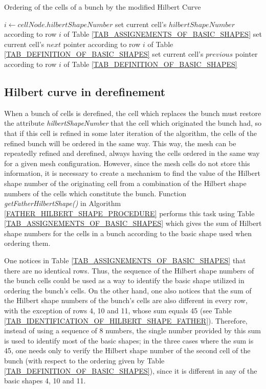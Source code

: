 \begin{algorithm}[!ht]
    \caption{Ordering of the cells of a bunch by the modified Hilbert Curve}
    \small{
    \begin{algorithmic}[1]
        \State $i \gets cellNode.hilbertShapeNumber$
            \State set current cell's $hilbertShapeNumber$ according to row $i$ of Table
            \ref{TAB_ASSIGNEMENTS_OF_BASIC_SHAPES}
            \State set current cell's $next$ pointer according to row $i$ of Table \ref{TAB_DEFINITION_OF_BASIC_SHAPES}
            \State set current cell's $previous$ pointer according to row $i$ of Table \ref{TAB_DEFINITION_OF_BASIC_SHAPES}
        \EndFor
    \end{algorithmic}
    }
\label{SORTING_REFINEMENT}
\end{algorithm}


\subsection{Hilbert curve in derefinement} \label{SUBSEC_HILBERT_CURVE_DEREFINEMENT}
When a bunch of cells is derefined, the cell which replaces the
bunch must restore the attribute \textit{hilbertShapeNumber} that
the cell which originated the bunch had, so that if this cell is
refined in some later iteration of the algorithm, the cells of the
refined bunch will be ordered in the same way. This way, the mesh
can be repeatedly refined and derefined, always having the cells
ordered in the same way for a given mesh configuration. However,
since the mesh cells do not store this information, it is necessary
to create a mechanism to find the value of the Hilbert shape number
of the originating cell from a combination of the Hilbert shape
numbers of the cells which constitute the bunch. Function
\textit{getFatherHilbertShape()} in Algorithm
\ref{FATHER_HILBERT_SHAPE_PROCEDURE} performs this task using Table
\ref{TAB_ASSIGNEMENTS_OF_BASIC_SHAPES} which gives the sum of Hilbert
shape numbers for the cells in a bunch according to the basic shape
used when ordering them.

One notices in Table \ref{TAB_ASSIGNEMENTS_OF_BASIC_SHAPES} that
there are no identical rows. Thus, the sequence of the Hilbert shape
numbers of the bunch cells could be used as a way to identify the
basic shape utilized in ordering the bunch's cells. On the other
hand, one also notices that the sum of the Hilbert shape numbers of
the bunch's cells are also different in every row, with the
exception of rows 4, 10 and 11, whose sum equals 45 (see Table
\ref{TAB_IDENTIFICATION_OF_HILBERT_SHAPE_FATHER}). Therefore,
instead of using a sequence of 8 numbers, the single number provided
by this sum is used to identify most of the basic shapes; in the
three cases where the sum is 45, one needs only to verify the
Hilbert shape number of the second cell of the bunch (with respect
to the ordering given by Table
\ref{TAB_DEFINITION_OF_BASIC_SHAPES}), since it is different in any
of the basic shapes 4, 10 and 11.

